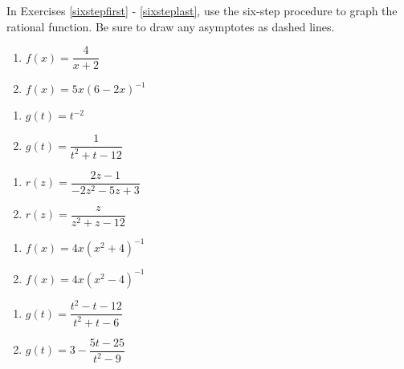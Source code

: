 In Exercises \ref{sixstepfirst} - \ref{sixsteplast}, use the six-step procedure to graph the rational function.  Be sure to draw any asymptotes as dashed lines.

\begin{multicols}{2}
\begin{enumerate}

\item $f(x) = \dfrac{4}{x + 2}$ \label{sixstepfirst}
\item $f(x) = 5x(6-2x)^{-1}$  

\setcounter{HW}{\value{enumi}}
\end{enumerate}
\end{multicols}

\begin{multicols}{2}
\begin{enumerate}
\setcounter{enumi}{\value{HW}}

\item $g(t) = t^{-2}$ 
\item $g(t) = \dfrac{1}{t^{2} + t - 12}$

\setcounter{HW}{\value{enumi}}
\end{enumerate}
\end{multicols}

\begin{multicols}{2}
\begin{enumerate}
\setcounter{enumi}{\value{HW}}

\item $r(z) = \dfrac{2z - 1}{-2z^{2} - 5z + 3}$
\item $r(z) = \dfrac{z}{z^{2} + z - 12}$ 

\setcounter{HW}{\value{enumi}}
\end{enumerate}
\end{multicols}

\begin{multicols}{2}
\begin{enumerate}
\setcounter{enumi}{\value{HW}}

\item $f(x) = 4x(x^2+4)^{-1}$
\item $f(x) = 4x(x^2-4)^{-1}$

\setcounter{HW}{\value{enumi}}
\end{enumerate}
\end{multicols}

\begin{multicols}{2}
\begin{enumerate}
\setcounter{enumi}{\value{HW}}

\item $g(t) = \dfrac{t^2-t-12}{t^2+t-6}$
\item $g(t) = 3- \dfrac{5t-25}{t^2-9}$  

\setcounter{HW}{\value{enumi}}
\end{enumerate}
\end{multicols}

